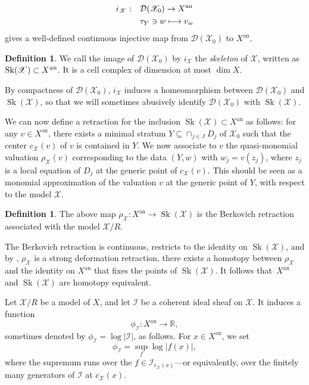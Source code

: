 \documentclass[JEP,XML,SOM,Unicode,published]{cedram}
\newcommand\mto{\mathchoice{\longmapsto}{\mapsto}{\mapsto}{\mapsto}}
\theoremstyle{definition}
\newtheorem{defn}[equation]{Definition}
\newcommand \R{\mathbb R}
\newcommand \X {\mathscr{X}}
\newcommand{\an}{\mathrm{an}}
\DeclareMathOperator{\Sk}{Sk}
\begin{document}
\begin{align*}
i_\X: & \quad \mathcal{D}(\X_0) \to X^{\an} \\
& \quad \tau_Y \ni w \mto v_w
\end{align*}
gives a well-defined continuous injective map from $\mathcal{D}(\X_0)$ to $X^{\an}$.
\begin{defn}
We call the image of $\mathcal{D}(\X_0)$ by $i_{\X}$ the \emph{skeleton} of $\X$, written as $\Sk(\X) \subset X^{\emph{an}}$. It is a cell complex of dimension at most $\dim X$.
\end{defn}
\noindent By compactness of $\mathcal{D}(\X_0)$, $i_{\X}$ induces a homeomorphism between $\mathcal{D}(\X_0)$ and $\Sk(\X)$, so that we will sometimes abusively identify $\mathcal{D}(\X_0)$ with $\Sk(\X)$.

We can now define a retraction for the inclusion $\Sk(\X) \subset X^{\an}$ as follows: for any $v \in X^{\an}$, there exists a minimal stratum $Y \subseteq \cap_{j \in J} D_j$ of $\X_0$ such that the center $c_{\X}(v)$ of $v$ is contained in $Y$. We now associate to $v$ the quasi-monomial valuation $\rho_{\X}(v)$ corresponding to the data $(Y, w)$ with $w_j = v(z_j)$, where $z_j$ is a local equation of $D_j$ at the generic point of $c_{\X}(v)$. This should be seen as a monomial approximation of the valuation $v$ at the generic point of $Y$, with respect to the model $\X$.
\begin{defn}
The above map $\rho_{\X}: X^{\an} \to \Sk(\X)$ is the Berkovich retraction associated with the model $\X/R$.
\end{defn}
The Berkovich retraction is continuous, restricts to the identity on $\Sk(\X)$, and by \cite{Th} \cite{Ber2}, $\rho_{\X}$ is a strong deformation retraction, \ie there exists a homotopy between $\rho_\X$ and the identity on $X^{\an}$ that fixes the points of $\Sk(\X)$. It follows that~$X^{\an}$ and $\Sk(\X)$ are homotopy equivalent.

Let $\X/R$ be a model of $X$, and let $\mathscr{I}$ be a coherent ideal sheaf on $\X$. It induces a function
\[
\phi_{\mathscr{I}}: X^{\an} \to \R,
\]
sometimes denoted by $\phi_{\mathscr{I}} = \log \lvert \mathscr{I} \rvert$, as follows. For $x \in X^{\an}$, we set
\[
\phi_{\mathscr{I}} = \sup_{f} \log \lvert f(x) \rvert,
\]
where the supremum runs over the $f \in \mathscr{I}_{c_{\X}(x)}$---or equivalently, over the finitely many generators of $\mathscr{I}$ at $c_{\X}(x)$.
\end{document}
